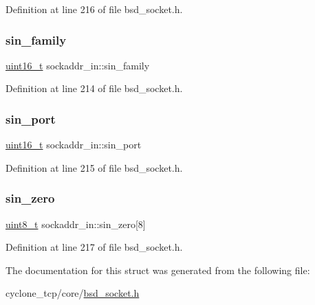 Definition at line 216 of file bsd\+\_\+socket.\+h.

\mbox{\label{structsockaddr__in_a1b187e5b6abc36bcf03efe678448ed75}} 
\subsubsection{\texorpdfstring{sin\+\_\+family}{sin\_family}}
{\footnotesize\ttfamily \hyperlink{stdint_8h_a273cf69d639a59973b6019625df33e30}{uint16\+\_\+t} sockaddr\+\_\+in\+::sin\+\_\+family}



Definition at line 214 of file bsd\+\_\+socket.\+h.

\mbox{\label{structsockaddr__in_a3cf9239fdd8bd32855d66a4b86349fbb}} 
\subsubsection{\texorpdfstring{sin\+\_\+port}{sin\_port}}
{\footnotesize\ttfamily \hyperlink{stdint_8h_a273cf69d639a59973b6019625df33e30}{uint16\+\_\+t} sockaddr\+\_\+in\+::sin\+\_\+port}



Definition at line 215 of file bsd\+\_\+socket.\+h.

\mbox{\label{structsockaddr__in_a4b2d5781ba9ced14492aea899b4e3274}} 
\subsubsection{\texorpdfstring{sin\+\_\+zero}{sin\_zero}}
{\footnotesize\ttfamily \hyperlink{stdint_8h_aba7bc1797add20fe3efdf37ced1182c5}{uint8\+\_\+t} sockaddr\+\_\+in\+::sin\+\_\+zero\mbox{[}8\mbox{]}}



Definition at line 217 of file bsd\+\_\+socket.\+h.



The documentation for this struct was generated from the following file\+:\begin{DoxyCompactItemize}
\item 
cyclone\+\_\+tcp/core/\hyperlink{bsd__socket_8h}{bsd\+\_\+socket.\+h}\end{DoxyCompactItemize}
